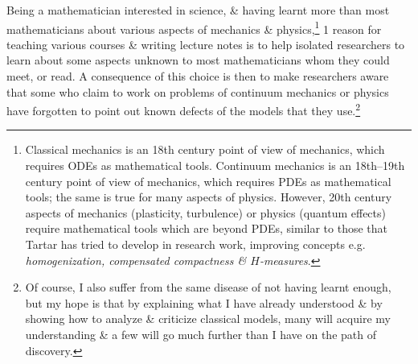 \documentclass{article}
\begin{document}
\begin{enumerate}
	Being a mathematician interested in science, \& having learnt more than most mathematicians about various aspects of mechanics \& physics,\footnote{Classical mechanics is an 18th century point of view of mechanics, which requires ODEs as mathematical tools. Continuum mechanics is an 18th--19th century point of view of mechanics, which requires PDEs as mathematical tools; the same is true for many aspects of physics. However, 20th century aspects of mechanics (plasticity, turbulence) or physics (quantum effects) require mathematical tools which are beyond PDEs, similar to those that {\sc Tartar} has tried to develop in research work, improving concepts e.g. {\it homogenization, compensated compactness \& $H$-measures}.} 1 reason for teaching various courses \& writing lecture notes is to help isolated researchers to learn about some aspects unknown to most mathematicians whom they could meet, or read. A consequence of this choice is then to make researchers aware that some who claim to work on problems of continuum mechanics or physics have forgotten to point out known defects of the models that they use.\footnote{Of course, I also suffer from the same disease of not having learnt enough, but my hope is that by explaining what I have already understood \& by showing how to analyze \& criticize classical models, many will acquire my understanding \& a few will go much further than I have on the path of discovery.}
	

\end{enumerate}
\end{document}
